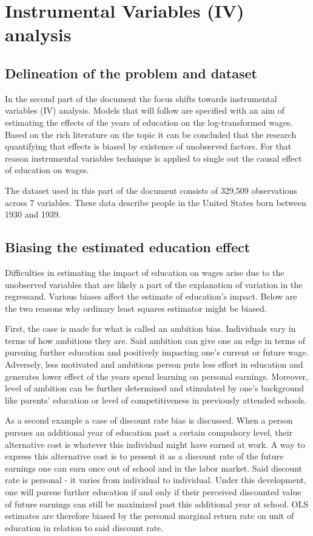 \documentclass{article}
\begin{document}
\section{Instrumental Variables (IV) analysis}

\subsection{Delineation of the problem and dataset}

In the second part of the document the focus shifts towards instrumental variables (IV) analysis. Models that will follow are specified with an aim of estimating the effects of the years of education on the log-transformed wages. Based on the rich literature on the topic it can be concluded that the research quantifying that effects is biased by existence of unobserved factors. For that reason instrumental variables technique is applied to single out the causal effect of education on wages.

The dataset used in this part of the document consists of 329,509 observations across 7 variables. These data describe people in the United States born between 1930 and 1939.

\subsection{Biasing the estimated education effect}

Difficulties in estimating the impact of education on wages arise due to the unobserved variables that are likely a part of the explanation of variation in the regressand. Various biases affect the estimate of education's impact. Below are the two reasons why ordinary least squares estimator might be biased.

First, the case is made for what is called an ambition bias. Individuals vary in terms of how ambitious they are. Said ambition can give one an edge in terms of pursuing further education and positively impacting one's current or future wage. Adversely, less motivated and ambitious person puts less effort in education and generates lower effect of the years spend learning on personal earnings. Moreover, level of ambition can be further determined and stimulated by one's background like parents' education or level of competitiveness in previously attended schools. 

As a second example a case of discount rate bias is discussed. When a person pursues an additional year of education past a certain compulsory level, their alternative cost is whatever this individual might have earned at work. A way to express this alternative cost is to present it as a discount rate of the future earnings one can earn once out of school and in the labor market. Said discount rate is personal - it varies from individual to individual. Under this development, one will pursue further education if and only if their perceived discounted value of future earnings can still be maximized past this additional year at school. OLS estimates are therefore biased by the personal marginal return rate on unit of education in relation to said discount rate.
\end{document}
